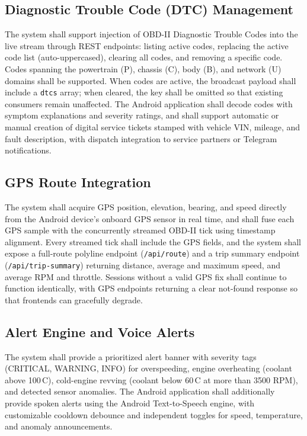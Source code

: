 \documentclass[10pt,a4paper]{report}
\begin{document}
\subsection{Diagnostic Trouble Code (DTC) Management}
The system shall support injection of OBD-II Diagnostic Trouble Codes into the live stream through REST endpoints: listing active codes, replacing the active code list (auto-uppercased), clearing all codes, and removing a specific code. Codes spanning the powertrain (P), chassis (C), body (B), and network (U) domains shall be supported. When codes are active, the broadcast payload shall include a \texttt{dtcs} array; when cleared, the key shall be omitted so that existing consumers remain unaffected. The Android application shall decode codes with symptom explanations and severity ratings, and shall support automatic or manual creation of digital service tickets stamped with vehicle VIN, mileage, and fault description, with dispatch integration to service partners or Telegram notifications. \par

\subsection{GPS Route Integration}
The system shall acquire GPS position, elevation, bearing, and speed directly from the Android device's onboard GPS sensor in real time, and shall fuse each GPS sample with the concurrently streamed OBD-II tick using timestamp alignment. Every streamed tick shall include the GPS fields, and the system shall expose a full-route polyline endpoint (\texttt{/api/route}) and a trip summary endpoint (\texttt{/api/trip-summary}) returning distance, average and maximum speed, and average RPM and throttle. Sessions without a valid GPS fix shall continue to function identically, with GPS endpoints returning a clear not-found response so that frontends can gracefully degrade. \par

\subsection{Alert Engine and Voice Alerts}
The system shall provide a prioritized alert banner with severity tags (CRITICAL, WARNING, INFO) for overspeeding, engine overheating (coolant above 100\,\textdegree{}C), cold-engine revving (coolant below 60\,\textdegree{}C at more than 3500 RPM), and detected sensor anomalies. The Android application shall additionally provide spoken alerts using the Android Text-to-Speech engine, with customizable cooldown debounce and independent toggles for speed, temperature, and anomaly announcements. \par
\end{document}
